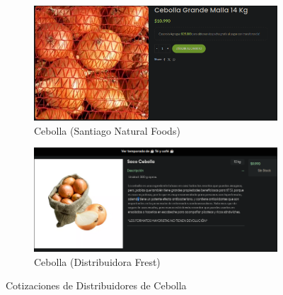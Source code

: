 \documentclass[12pt]{article}
\begin{document}
        \begin{figure}[h!] %
            \centering
            \begin{subfigure}{0.45\textwidth}
                \centering
                \includegraphics[width=0.9\linewidth]{nat} %
                \caption{Cebolla (Santiago Natural Foods)}
                \label{fig:santiago_natural_foods}
            \end{subfigure}
            \hfill
            \begin{subfigure}{0.45\textwidth}
                \centering
                \includegraphics[width=0.9\linewidth]{fres} %
                \caption{Cebolla (Distribuidora Frest)}
                \label{fig:distribuidora_frest}
            \end{subfigure}
            \caption{Cotizaciones de Distribuidores de Cebolla}
            \label{fig:cotizaciones_cebolla}
        \end{figure} %
        \newpage
        
\end{document}

